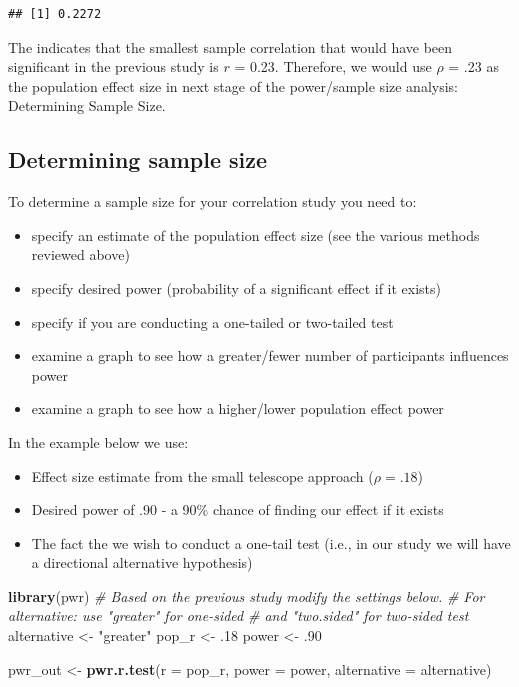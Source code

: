 \documentclass[
]{krantz}
\makeatletter
\newenvironment{Shaded}{\begin{snugshade}}{\end{snugshade}}
\newcommand{\CommentTok}[1]{\textcolor[rgb]{0.37,0.37,0.37}{\textit{#1}}}
\newcommand{\DataTypeTok}[1]{\textcolor[rgb]{0.27,0.27,0.27}{#1}}
\newcommand{\FloatTok}[1]{\textcolor[rgb]{0.06,0.06,0.06}{#1}}
\newcommand{\KeywordTok}[1]{\textcolor[rgb]{0.27,0.27,0.27}{\textbf{#1}}}
\newcommand{\NormalTok}[1]{#1}
\newcommand{\StringTok}[1]{\textcolor[rgb]{0.5,0.5,0.5}{#1}}
\newenvironment{kframe}{%
\medskip{}
\setlength{\fboxsep}{.8em}
 \def\at@end@of@kframe{}%
 \ifinner\ifhmode%
  \def\at@end@of@kframe{\end{minipage}}%
  \begin{minipage}{\columnwidth}%
 \fi\fi%
 \def\FrameCommand##1{\hskip\@totalleftmargin \hskip-\fboxsep
 \colorbox{shadecolor}{##1}\hskip-\fboxsep
     \hskip-\linewidth \hskip-\@totalleftmargin \hskip\columnwidth}%
 \MakeFramed {\advance\hsize-\width
   \@totalleftmargin\z@ \linewidth\hsize
   \@setminipage}}%
 {\par\unskip\endMakeFramed%
 \at@end@of@kframe}
\renewenvironment{Shaded}{\begin{kframe}}{\end{kframe}}
\makeatother
\begin{document}
\begin{verbatim}
## [1] 0.2272
\end{verbatim}

The indicates that the smallest sample correlation that would have been significant in the previous study is \(r\) = 0.23. Therefore, we would use \(\rho\) = .23 as the population effect size in next stage of the power/sample size analysis: Determining Sample Size.

\hypertarget{determining-sample-size-2}{%
\subsection{Determining sample size}\label{determining-sample-size-2}}

To determine a sample size for your correlation study you need to:

\begin{itemize}
\item
  specify an estimate of the population effect size (see the various methods reviewed above)
\item
  specify desired power (probability of a significant effect if it exists)
\item
  specify if you are conducting a one-tailed or two-tailed test
\item
  examine a graph to see how a greater/fewer number of participants influences power
\item
  examine a graph to see how a higher/lower population effect power
\end{itemize}

In the example below we use:

\begin{itemize}
\item
  Effect size estimate from the small telescope approach (\(\rho = .18\))
\item
  Desired power of .90 - a 90\% chance of finding our effect if it exists
\item
  The fact the we wish to conduct a one-tail test (i.e., in our study we will have a directional alternative hypothesis)
\end{itemize}

\begin{Shaded}
\begin{Highlighting}[]
\KeywordTok{library}\NormalTok{(pwr)}
\CommentTok{# Based on the previous study modify the settings below.}
\CommentTok{# For alternative: use "greater" for one-sided }
\CommentTok{# and "two.sided" for two-sided test}
\NormalTok{alternative <-}\StringTok{ "greater"}
\NormalTok{pop_r <-}\StringTok{ }\FloatTok{.18}
\NormalTok{power <-}\StringTok{ }\FloatTok{.90}

\NormalTok{pwr_out <-}\StringTok{ }\KeywordTok{pwr.r.test}\NormalTok{(}\DataTypeTok{r =}\NormalTok{ pop_r, }
                      \DataTypeTok{power =}\NormalTok{ power,}
                      \DataTypeTok{alternative =}\NormalTok{ alternative)}
\end{Highlighting}
\end{Shaded}
\end{document}
